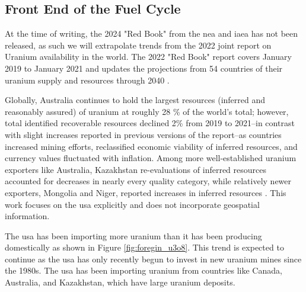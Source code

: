 


\subsection{Front End of the Fuel Cycle}
\label{sec:front_end}
At the time of writing, the 2024 "Red Book" from the \gls{nea} and \gls{iaea}
has not been released, as such we will extrapolate trends from the 2022 joint
report on Uranium availability in the world. The 2022 "Red Book" report covers
January 2019 to January 2021 and updates the projections from 54 countries of
their uranium supply and resources through 2040 \cite{nea_red_book_2022}.

Globally, Australia continues to hold the largest resources (inferred and
reasonably assured) of uranium at roughly 28 \% of the world's total; however,
total identified recoverable resources declined 2\% from 2019 to 2021--in
contrast with slight increases reported in previous versions of the report--as
countries increased mining efforts, reclassified economic viability of inferred
resources, and currency values fluctuated with inflation. Among more
well-established uranium exporters like Australia, Kazakhstan re-evaluations of
inferred resources accounted for decreases in nearly every quality category,
while relatively newer exporters, Mongolia and Niger, reported increases in
inferred resources \cite{nea_red_book_2022}. This work focuses on the \gls{usa}
explicitly and does not incorporate geospatial information.

The \gls{usa} has been importing more uranium than it has been producing
domestically as shown in Figure \ref{fig:foregin_u3o8}. This trend is expected
to continue as the \gls{usa} has only recently begun to invest in new uranium
mines since the 1980s. The \gls{usa} has been importing uranium from countries
like Canada, Australia, and Kazakhstan, which have large uranium deposits.

